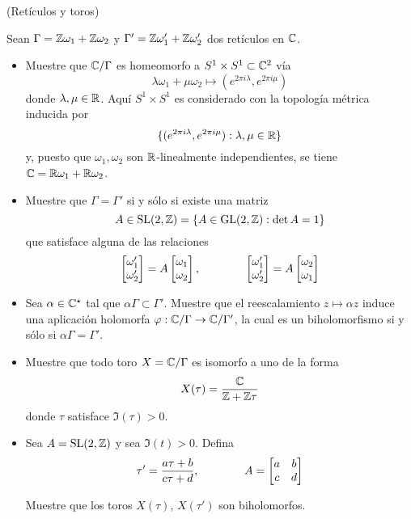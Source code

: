 \begin{exercise}
(Retículos y toros)

\vspace{2mm}

\noindent Sean $\Gamma = \mathbb Z \omega_1 + \mathbb Z \omega_2$ y $\Gamma' = \mathbb Z \omega_1' + \mathbb Z \omega_2'$ dos retículos en $\mathbb C$.

\begin{itemize}
    \item Muestre que $\mathbb C / \Gamma$ es homeomorfo a $S^1 \times S^1 \subset \mathbb C^2$ vía
    $$\lambda \omega_1 + \mu \omega_2 \mapsto (e^{2\pi i\lambda}, e^{2\pi i\mu})$$
    donde $\lambda, \mu \in \mathbb R$. Aquí $S^1 \times S^1$ es considerado con la topología métrica inducida por
    $$\{ (e^{2\pi i\lambda}, e^{2\pi i\mu}) : \lambda, \mu \in \mathbb R \}$$
    y, puesto que $\omega_1, \omega_2$ son $\mathbb R$-linealmente independientes, se tiene $\mathbb C = \mathbb R \omega_1 + \mathbb R \omega_2$.
    
    \item Muestre que $\Gamma = \Gamma'$ si y sólo si existe una matriz
    $$A \in \operatorname{SL}(2, \mathbb Z) = \{ A \in \operatorname{GL}(2, \mathbb Z) : \det A = 1 \}$$
    que satisface alguna de las relaciones
    $$
    \begin{bmatrix} \omega_1' \\ \omega_2' \end{bmatrix} = A \begin{bmatrix} \omega_1 \\ \omega_2 \end{bmatrix},
    \qquad \qquad
    \begin{bmatrix} \omega_1' \\ \omega_2' \end{bmatrix} = A \begin{bmatrix} \omega_2 \\ \omega_1 \end{bmatrix}
    $$
    
    \item Sea $\alpha \in \mathbb C^\star$ tal que $\alpha \Gamma \subset \Gamma'$. Muestre que el reescalamiento $z \mapsto \alpha z$ induce una aplicación holomorfa $\varphi : \mathbb C / \Gamma \to \mathbb C / \Gamma'$, la cual es un biholomorfismo si y sólo si $\alpha \Gamma = \Gamma'$.
    
    \item Muestre que todo toro $X = \mathbb C / \Gamma$ es isomorfo a uno de la forma
    $$X(\tau) = \frac {\mathbb C} {\mathbb Z + \mathbb Z \tau}$$
    donde $\tau$ satisface $\Im(\tau) > 0$.
    
    \item Sea $A = \operatorname{SL}(2, \mathbb Z)$ y sea $\Im(t) > 0$. Defina
    $$\tau' = \frac {a\tau + b} {c\tau + d}, \qquad \qquad A = \begin{bmatrix} a & b \\ c & d \end{bmatrix}$$
    
    Muestre que los toros $X(\tau)$, $X(\tau')$ son biholomorfos.
\end{itemize}
\end{exercise}

